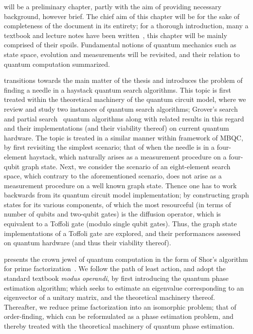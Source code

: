 \noindent
{} will be a preliminary chapter, partly with the aim of providing necessary background, however brief. The chief aim of this chapter will be for the sake of completeness of the document in its entirety; for a thorough introduction, many a textbook and lecture notes have been written~\cite{Mike&Ike,Preskill_1997,Dewolf_2019}, this chapter will be mainly comprised of their spoils. Fundamental notions of quantum mechanics such as state space, evolution and measurements will be revisited, and their relation to quantum computation summarized.

\bigskip
\noindent
{} transitions towards the main matter of the thesis and introduces the problem of finding a needle in a haystack \via quantum search algorithms. This topic is first treated within the theoretical machinery of the quantum circuit model, where we review and study two instances of quantum search algorithms; Grover's search~\cite{Grover_1997} and partial search~\cite{Grover_2005} quantum algorithms along with related results in this regard and their implementations (and their viability thereof) on current quantum hardware. The topic is treated in a similar manner within framework of \gls{MBQC}, by first revisiting the simplest scenario; that of when the needle is in a four-element haystack, which naturally arises as a measurement procedure on a four-qubit graph state. Next, we consider the scenario of an eight-element search space, which contrary to the aforementioned scenario, does not arise as a measurement procedure on a well known graph state. Thence one has to work backwards from its quantum circuit model implementation; by constructing graph states for its various components, of which the most resourceful (in terms of number of qubits and two-qubit gates) is the diffusion operator, which is equivalent to a Toffoli gate (modulo single qubit gates). Thus, the graph state implementations of a Toffoli gate are explored, and their performances assessed on quantum hardware (and thus their viability thereof).

\bigskip
\noindent
{} presents the crown jewel of quantum computation in the form of Shor's algorithm for prime factorization~\cite{Shor_1997}. We follow the path of least action, and adopt the standard textbook \emph{modus operandi}, by first introducing the quantum phase estimation algorithm; which seeks to estimate an eigenvalue corresponding to an eigenvector of a unitary matrix, and the theoretical machinery thereof. Thereafter, we reduce prime factorization into an isomorphic problem; that of order-finding, which can be reformulated as a phase estimation problem, and thereby treated with the theoretical machinery of quantum phase estimation. 


